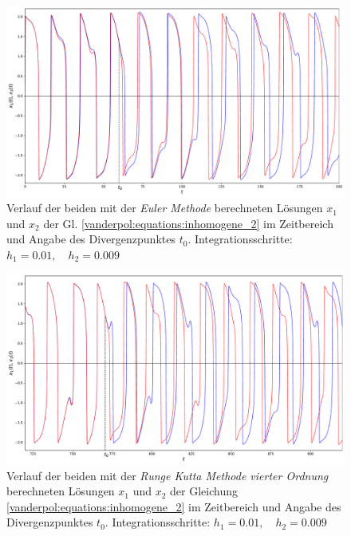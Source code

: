 \begin{figure}
\includegraphics[width=\textwidth]{papers/vanderpol/figures/EULER_schritt_delta_e-3.pdf}
\caption{Verlauf der beiden mit der {\em Euler Methode} berechneten Lösungen $x_1$ und $x_2$ der Gl. \eqref{vanderpol:equations:inhomogene_2} im Zeitbereich und Angabe des Divergenzpunktes $t_0$. Integrationsschritte: $h_1 = 0.01, \quad h_2 = 0.009$\label{vanderpol:figures:EULER_schritt}}
\end{figure}

\begin{figure}
\includegraphics[width=\textwidth]{papers/vanderpol/figures/RK_schritt_delta_e-3.pdf}
\caption{Verlauf der beiden mit der {\em Runge Kutta Methode vierter Ordnung} berechneten Lösungen $x_1$ und $x_2$ der Gleichung \eqref{vanderpol:equations:inhomogene_2} im Zeitbereich und Angabe des Divergenzpunktes $t_0$. Integrationsschritte: $h_1 = 0.01, \quad h_2 = 0.009$\label{vanderpol:figures:RK_schritt_e-3}}
\end{figure}


